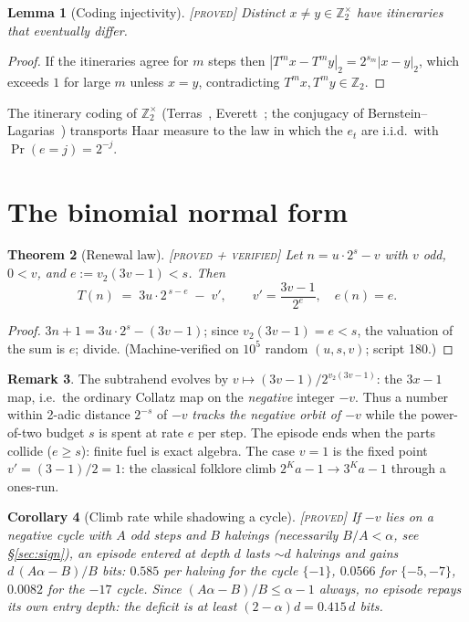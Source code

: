 \documentclass[11pt]{article}
\newtheorem{theorem}{Theorem}[section]
\newtheorem{lemma}[theorem]{Lemma}
\newtheorem{corollary}[theorem]{Corollary}
\theoremstyle{definition}
\newtheorem{remark}[theorem]{Remark}
\newcommand{\PROVED}{\textup{[\textsc{proved}]}}
\newcommand{\PROVEDVER}{\textup{[\textsc{proved + verified}]}}
\newcommand{\Z}{\mathbb{Z}}
\newcommand{\vv}{v_2}
\begin{document}
\begin{lemma}[Coding injectivity]\label{lem:inj} \PROVED\;
Distinct $x\neq y\in\Z_2^{\times}$ have itineraries that eventually differ.
\end{lemma}
\begin{proof}
If the itineraries agree for $m$ steps then
$|T^{m}x-T^{m}y|_2=2^{s_m}|x-y|_2$, which exceeds $1$ for large $m$ unless
$x=y$, contradicting $T^m x, T^m y \in \Z_2$.
\end{proof}

The itinerary coding of $\Z_2^\times$ (Terras~\cite{Terras}, Everett~\cite{Everett};
the conjugacy of Bernstein--Lagarias~\cite{BL}) transports Haar measure to the
law in which the $e_t$ are i.i.d.\ with $\Pr(e=j)=2^{-j}$.

\section{The binomial normal form}

\begin{theorem}[Renewal law]\label{thm:renewal} \PROVEDVER\;
Let $n=u\cdot 2^{s}-v$ with $v$ odd, $0<v$, and $e:=\vv(3v-1)<s$. Then
\[
T(n)\;=\;3u\cdot 2^{\,s-e}\;-\;v', \qquad v'=\frac{3v-1}{2^{e}},\quad
e(n)=e .
\]
\end{theorem}
\begin{proof}
$3n+1=3u\cdot 2^{s}-(3v-1)$; since $\vv(3v-1)=e<s$, the valuation of the sum
is $e$; divide. (Machine-verified on $10^{5}$ random $(u,s,v)$; script 180.)
\end{proof}

\begin{remark}
The subtrahend evolves by $v\mapsto (3v-1)/2^{\vv(3v-1)}$: the $3x{-}1$ map,
i.e.\ the ordinary Collatz map on the \emph{negative} integer $-v$. Thus a
number within 2-adic distance $2^{-s}$ of $-v$ \emph{tracks the negative orbit
of $-v$} while the power-of-two budget $s$ is spent at rate $e$ per step. The
episode ends when the parts collide ($e\ge s$): finite fuel is exact algebra.
The case $v=1$ is the fixed point $v'=(3-1)/2=1$: the classical folklore climb
$2^{K}a-1 \to 3^{K}a-1$ through a ones-run.
\end{remark}

\begin{corollary}[Climb rate while shadowing a cycle]\label{cor:rate} \PROVED\;
If $-v$ lies on a negative cycle with $A$ odd steps and $B$ halvings
(necessarily $B/A<\alpha$, see \S\ref{sec:sign}), an episode entered at depth
$d$ lasts $\sim d$ halvings and gains $d\,(A\alpha-B)/B$ bits: $0.585$ per
halving for the cycle $\{-1\}$, $0.0566$ for $\{-5,-7\}$, $0.0082$ for the
$-17$ cycle. Since $(A\alpha-B)/B\le \alpha-1$ always, \emph{no episode repays
its own entry depth}: the deficit is at least $(2-\alpha)d=0.415\,d$ bits.
\end{corollary}
\end{document}
